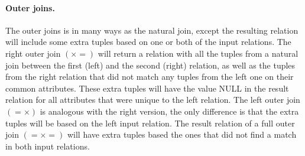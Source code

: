 \paragraph{Outer joins.}
\label{sect:theory:relAlg:outerJoin}
The outer joins is in many ways as the natural join, except the resulting relation will include some extra
tuples based on one or both of the input relations. The right outer join $(\times=)$ will return a relation with
all the tuples from a natural join between the first (left) and the second (right) relation, as well as the tuples
from the right relation that did not match any tuples from the left one on their common attributes. These extra
tuples will have the value NULL in the result relation for all attributes that were unique to the left relation.
The left outer join $(=\times)$ is analogous with the right version, the only difference is that the extra tuples
will be based on the left input relation. The result relation of a full outer join $(=\times=)$ will have extra
tuples based the ones that did not find a match in both input relations.
